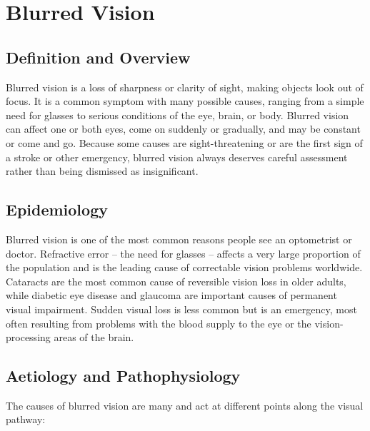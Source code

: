 \chapter{Blurred Vision}

\section*{Definition and Overview}
Blurred vision is a loss of sharpness or clarity of sight, making objects look out of focus. It is a common symptom with many possible causes, ranging from a simple need for glasses to serious conditions of the eye, brain, or body. Blurred vision can affect one or both eyes, come on suddenly or gradually, and may be constant or come and go. Because some causes are sight-threatening or are the first sign of a stroke or other emergency, blurred vision always deserves careful assessment rather than being dismissed as insignificant.

\section*{Epidemiology}
Blurred vision is one of the most common reasons people see an optometrist or doctor. Refractive error -- the need for glasses -- affects a very large proportion of the population and is the leading cause of correctable vision problems worldwide. Cataracts are the most common cause of reversible vision loss in older adults, while diabetic eye disease and glaucoma are important causes of permanent visual impairment. Sudden visual loss is less common but is an emergency, most often resulting from problems with the blood supply to the eye or the vision-processing areas of the brain.

\section*{Aetiology and Pathophysiology}
The causes of blurred vision are many and act at different points along the visual pathway:

